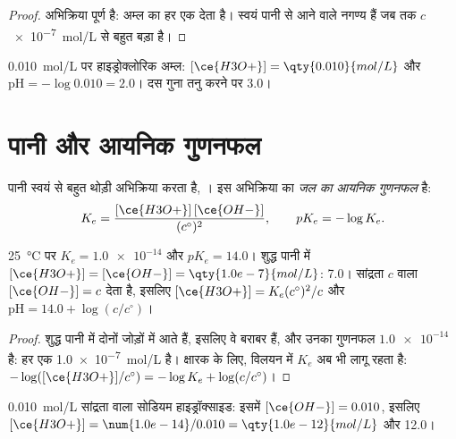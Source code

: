 \begin{proof}
अभिक्रिया  पूर्ण है: अम्ल का हर 
एक  देता है। स्वयं पानी से आने वाले  नगण्य हैं
जब तक $c$ \qty{e-7}{mol/L} से बहुत बड़ा है।
\end{proof}

\begin{example}[हाइड्रोक्लोरिक अम्ल]\label{ex:g12:ka-and-pka:hcl}
\qty{0.010}{mol/L} पर हाइड्रोक्लोरिक अम्ल: $[\ce{H3O+}] = \qty{0.010}{mol/L}$
और $\mathrm{pH} = -\log 0.010 = 2.0$। दस गुना तनु करने पर  3.0।
\end{example}

\section{पानी और आयनिक गुणनफल}


\begin{definition}\label{def:g12:ka-and-pka:ionic-product}
पानी स्वयं से बहुत थोड़ी अभिक्रिया करता है, । इस
अभिक्रिया का  \emph{जल का आयनिक
गुणनफल} है:
\[
  K_e = \frac{[\ce{H3O+}]\,[\ce{OH-}]}{(c^\circ)^2},
  \qquad pK_e = -\log K_e .
\]
\end{definition}

\begin{proposition}[उदासीन पानी और प्रबल क्षारक]\label{prop:g12:ka-and-pka:ke}
\qty{25}{\celsius} पर $K_e = \num{1.0e-14}$ और $pK_e = 14.0$। शुद्ध
पानी में $[\ce{H3O+}] = [\ce{OH-}] = \qty{1.0e-7}{mol/L}$:  7.0। सांद्रता $c$
वाला  $[\ce{OH-}] = c$ देता है, इसलिए
$[\ce{H3O+}] = K_e (c^\circ)^2 / c$ और $\mathrm{pH} = 14.0 + \log(c/c^\circ)$।
\end{proposition}

\begin{proof}
शुद्ध पानी में दोनों  जोड़ों में आते हैं, इसलिए वे बराबर हैं, और उनका
गुणनफल $\num{1.0e-14}$ है: हर एक \qty{1.0e-7}{mol/L} है। क्षारक के लिए,
विलयन में $K_e$ अब भी लागू रहता है:
$-\log([\ce{H3O+}]/c^\circ) = -\log K_e + \log(c/c^\circ)$।
\end{proof}

\begin{example}[सोडियम हाइड्रॉक्साइड]\label{ex:g12:ka-and-pka:naoh}
\qty{0.010}{mol/L} सांद्रता वाला सोडियम हाइड्रॉक्साइड: इसमें $[\ce{OH-}] = 0.010$, इसलिए
$[\ce{H3O+}] = \num{1.0e-14}/0.010 = \qty{1.0e-12}{mol/L}$ और  12.0।
\end{example}

